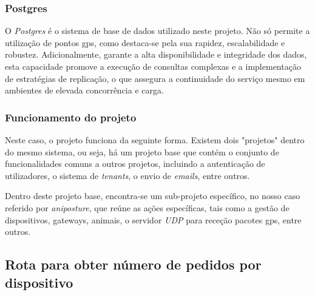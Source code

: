 \subsubsection{\textbf{Postgres}}
O \textit{Postgres} é o sistema de base de dados utilizado neste projeto. Não só permite a utilização de pontos \acs{gps}, como destaca-se pela sua rapidez, escalabilidade e robustez. Adicionalmente, garante a alta disponibilidade e integridade dos dados, esta capacidade promove a execução de consultas complexas e a implementação de estratégias de replicação, o que assegura a continuidade do serviço mesmo em ambientes de elevada concorrência e carga.

\subsubsection{\textbf{Funcionamento do projeto}}
Neste caso, o projeto funciona da seguinte forma. Existem dois "projetos" dentro do mesmo sistema, ou seja, há um projeto base que contém o conjunto de funcionalidades comuns a outros projetos, incluindo a autenticação de utilizadores, o sistema de \textit{tenants}, o envio de \textit{emails}, entre outros.

Dentro deste projeto base, encontra-se um sub-projeto específico, no nosso caso referido por \textit{aniposture}, que reúne as ações específicas, tais como a gestão de dispositivos, gateways, animais, o servidor \textit{UDP} para receção pacotes \acs{gps}, entre outros.

\subsection{Rota para obter número de pedidos por dispositivo} %



